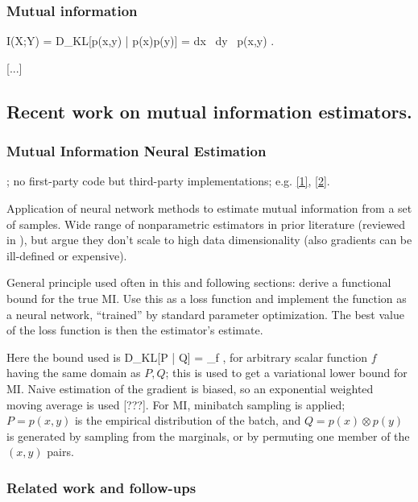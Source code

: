 \documentclass[notitlepage,openany,11pt]{report}
\theoremstyle{plain}%
\numberwithin{equation}{section}
\begin{document}
\subsubsection{Mutual information}
\be
I(X;Y) = D_{KL}[p(x,y) | p(x)p(y)] = \int\! dx \, dy \, p(x,y) \log {}  .
\ee


[...]

\subsection{Recent work on mutual information estimators.}

\subsubsection{Mutual Information Neural Estimation}
\cite{BelghaziEtAl:18}; no first-party code but third-party implementations; e.g. \href{https://github.com/gtegner/mine-pytorch}{[1]}, \href{https://github.com/MasanoriYamada/Mine_pytorch}{[2]}.

Application of neural network methods to estimate mutual information from a set of samples. Wide range of nonparametric estimators in prior literature (reviewed in \cite{Paninski:03}), but argue they don't scale to high data dimensionality (also gradients can be ill-defined or expensive).

General principle used often in this and following sections: derive a functional bound for the true MI. Use this as a loss function and implement the function as a neural network, ``trained'' by standard parameter optimization. The best value of the loss function is then the estimator's estimate.

Here the bound used is
\be
D_{KL}[P | Q] = \sup_{f} ,
\ee
for arbitrary scalar function $f$ having the same domain as $P,Q$; this is used to get a variational lower bound for MI. Naive estimation of the gradient is biased, so an exponential weighted moving average is used [???]. For MI, minibatch sampling is applied; $P = p(x,y)$ is the empirical distribution of the batch, and $Q = p(x) \otimes p(y)$ is generated by sampling from the marginals, or by permuting one member of the $(x,y)$ pairs. 

\subsubsection{Related work and follow-ups}
\end{document}
